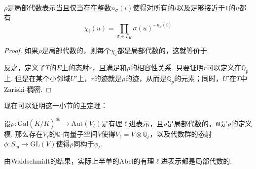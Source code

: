 \begin{cprop}
    $\rho$是局部代数表示当且仅当存在整数$n_{\sigma}(i)$使得对所有的$i$以及足够接近于$1$的$u$都有
    \begin{equation}
        \chi_i(u) = \prod_{\sigma\in \Gamma_K} \sigma(u)^{-n_{\sigma}(i)} \label{eqns::temp::1}
    \end{equation}
\end{cprop}

\begin{proof}
    如果$\rho$是局部代数的，则每个$\chi_i$都是局部代数的，这就等价于.

    反之，定义了$T$的$E$上的态射$r$，且满足和$\rho$的相容性关系. 只要证明$r$可以定义在$\mathbb{Q}_p$上. 但是在某个小邻域$U'$上，$r$的迹就是$\rho$的迹，从而是$\mathbb{Q}_p$的元素；同时，$U'$在$T$中Zariski-稠密.
\end{proof}

现在可以证明这一小节的主定理：

\begin{cthm}
    设$\rho: \mathrm{Gal}(\overline{K}/K)^{ab} \to \mathrm{Aut}(V_{\ell})$是有理$\ell$进表示，且$\rho$是局部代数的，$\mathfrak{m}$是$\rho$的定义模. 那么存在$V_{\ell}$的$\mathbb{Q}$-向量子空间$V$使得$V_{\ell} = V\otimes \mathbb{Q}_{\ell}$，以及代数群的态射$\phi: S_{\mathfrak{m}}\to \mathrm{GL}(V)$使得$\rho$同构于$\phi_{\ell}$.
\end{cthm}

\begin{crem}
    由Waldschmidt的结果，实际上半单的Abel的有理$\ell$进表示都是局部代数的\cite{waldschmidt1981transcendance}.
\end{crem}
